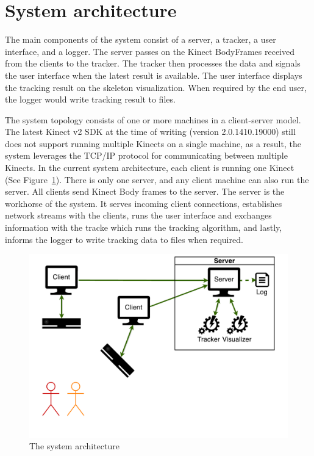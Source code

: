 \section{System architecture}
\label{sec:design_architecture}

The main components of the system consist of a server, a tracker, a user interface, and a logger. The server passes on the Kinect BodyFrames received from the clients to the tracker. The tracker then processes the data and signals the user interface when the latest result is available. The user interface displays the tracking result on the skeleton visualization. When required by the end user, the logger would write tracking result to files.

The system topology consists of one or more machines in a client-server model. The latest Kinect v2 SDK at the time of writing (version 2.0.1410.19000) still does not support running multiple Kinects on a single machine, as a result, the system leverages the TCP/IP protocol for communicating between multiple Kinects. In the current system architecture, each client is running one Kinect (See Figure~\ref{fig:system_architecture}). There is only one server, and any client machine can also run the server. All clients send Kinect Body frames to the server. The server is the workhorse of the system. It serves incoming client connections, establishes network streams with the clients, runs the user interface and exchanges information with the tracke which runs the tracking algorithm, and lastly, informs the logger to write tracking data to files when required.

\begin{figure}[!h]
  \centering

  \includegraphics[width=0.8\linewidth]{figs/system_architecture}
  
  \caption{The system architecture}
  
  \label{fig:system_architecture}
\end{figure}


